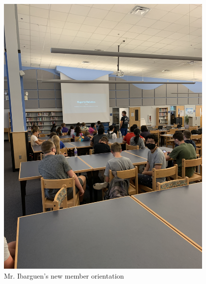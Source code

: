 \begin{figure}[ht]
\centering
\begin{minipage}[b]{.48\textwidth}
  \centering
  \includegraphics[width=0.95\textwidth]{Meetings/August/08-11-21/IMG_2430 - Nathan Forrer.JPG}
  \caption{Mr. Ibarguen's new member orientation}
  \label{fig:081121_1}
\end{minipage}%
\hfill%
\begin{minipage}[b]{.48\textwidth}
  \centering

\end{minipage}
\end{figure}
